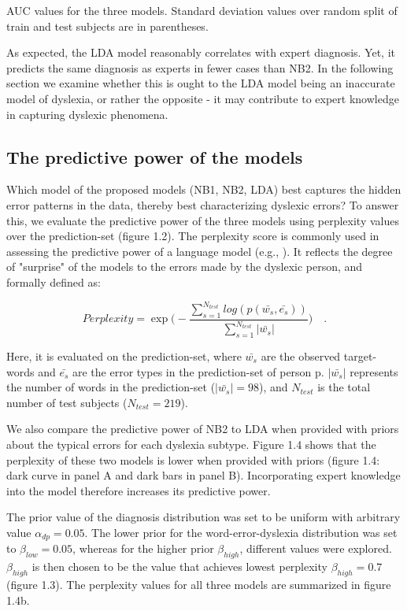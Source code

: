 {{\begin{table}
AUC values for the three models. Standard deviation values over random split of train and test subjects are in parentheses.
\end{table}

As expected, the LDA model reasonably correlates with expert diagnosis. Yet, it predicts the same diagnosis as experts in fewer cases than NB2. In the following section we examine whether this is ought to the LDA model being an inaccurate model of dyslexia, or rather the opposite - it may contribute to expert knowledge in capturing dyslexic phenomena.

\subsection{The predictive power of the models}
Which model of the proposed models (NB1, NB2, LDA) best captures the hidden error patterns in the data, thereby best characterizing dyslexic errors? To answer this, we evaluate the predictive power of the three models using perplexity values over the prediction-set (figure 1.2).
The perplexity score is commonly used in assessing the predictive power of a language model (e.g., \citealp{bnj03}). It reflects the degree of "surprise" of the models to the errors made by the dyslexic person, and formally defined as: 

\begin{equation}
Perplexity = \exp{\Bigg(-\frac{\sum_{s=1}^{N_{test}} log(p(\bar{w_s}, \bar{e_s}))}{\sum_{s=1}^{N_{test}}|\bar{w_s}|}\Bigg)} \quad .
\end{equation}

Here, it is evaluated on the prediction-set, where $ \bar{w_s} $ are the observed target-words and $ \bar{e_s} $ are the error types in the prediction-set of person p. $|\bar{w_s}|$ represents the number of words in the prediction-set ($|\bar{w_s}| = 98$), and $ N_{test} $ is the total number of test subjects ($ N_{test} = 219 $).

We also compare the predictive power of NB2 to LDA when provided with priors about the typical errors for each dyslexia subtype. Figure 1.4 shows that the perplexity of these two models is lower when provided with priors (figure 1.4: dark curve in panel A and dark bars in panel B). Incorporating expert knowledge into the model therefore increases its predictive power.

The prior value of the diagnosis distribution was set to be uniform with arbitrary value $ \alpha_{dp} = 0.05 $. The lower prior for the word-error-dyslexia distribution was set to $ \beta_{low} = 0.05 $, whereas for the higher prior $ \beta_{high} $, different values were explored. $ \beta_{high} $ is then chosen to be the value that achieves lowest perplexity $ \beta_{high} = 0.7 $ (figure 1.3). The perplexity values for all three models are summarized in figure 1.4b.

}}
